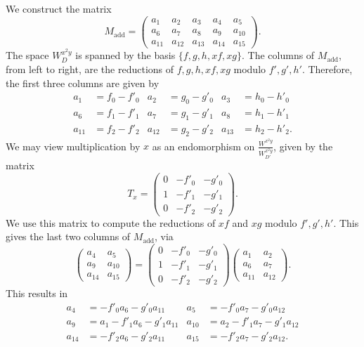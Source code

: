 We construct the matrix 
\[ M_{\text{add}} =
\begin{pmatrix}
  a_1 & a_2 & a_3 & a_4 & a_5 \\
  a_6 & a_7 & a_8 & a_9 & a_{10} \\
  a_{11} & a_{12} & a_{13} & a_{14} & a_{15}
\end{pmatrix}. \]
The space $W_D^{x^2y}$ is spanned by the basis $\{f,g,h,xf,xg\}$.
The columns of $M_{\text{add}}$, from left to right, are the reductions of $f,g,h,xf,xg$ modulo $f',g',h'$.
Therefore, the first three columns are given by
\begin{align*}
  a_1    &= f_0 - f'_0 & a_2    &= g_0 - g'_0 & a_3    &= h_0 - h'_0 \\
  a_6    &= f_1 - f'_1 & a_7    &= g_1 - g'_1 & a_8    &= h_1 - h'_1 \\
  a_{11} &= f_2 - f'_2 & a_{12} &= g_2 - g'_2 & a_{13} &= h_2 - h'_2.
\end{align*}
We may view multiplication by $x$ as an endomorphism on $\frac {W^{x^2y}}{W_{D'}^{x^2y}}$, given by the matrix
\[ T_x = \begin{pmatrix}
    0 & -f'_0 & -g'_0 \\
    1 & -f'_1 & -g'_1 \\
    0 & -f'_2 & -g'_2
  \end{pmatrix}. \]
We use this matrix to compute the reductions of $xf$ and $xg$ modulo $f',g',h'$.
This gives the last two columns of $M_{\text{add}}$, via
\[ 
  \begin{pmatrix}
    a_4    & a_5    \\
    a_9    & a_{10} \\
    a_{14} & a_{15}
  \end{pmatrix} = 
  \begin{pmatrix}
    0 & -f'_0 & -g'_0 \\
    1 & -f'_1 & -g'_1 \\
    0 & -f'_2 & -g'_2
  \end{pmatrix}
  \begin{pmatrix}
    a_1    & a_2    \\
    a_6    & a_7    \\
    a_{11} & a_{12}
  \end{pmatrix}.
\]
This results in
\begin{align*}
  a_4    &=     - f'_0a_6 - g'_0a_{11} & a_5    &=     - f'_0a_7 - g'_0a_{12} \\
  a_9    &= a_1 - f'_1a_6 - g'_1a_{11} & a_{10} &= a_2 - f'_1a_7 - g'_1a_{12} \\
  a_{14} &=     - f'_2a_6 - g'_2a_{11} & a_{15} &=     - f'_2a_7 - g'_2a_{12}.
\end{align*}

